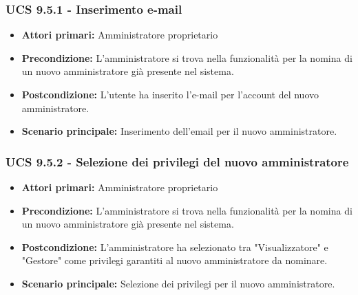 \subsubsection{UCS 9.5.1 - Inserimento e-mail}
\begin{itemize}
\item \textbf{Attori primari:} Amministratore proprietario
\item \textbf{Precondizione:} L'amministratore si trova nella funzionalità per la nomina di un nuovo amministratore già presente nel sistema.
\item \textbf{Postcondizione:} L'utente ha inserito l'e-mail per l'account del nuovo amministratore.
\item \textbf{Scenario principale:} Inserimento dell'email per il nuovo amministratore.
\end{itemize}


\subsubsection{UCS 9.5.2 - Selezione dei privilegi del nuovo amministratore}
\begin{itemize}
\item \textbf{Attori primari:} Amministratore proprietario
\item \textbf{Precondizione:} L'amministratore si trova nella funzionalità per la nomina di un nuovo amministratore già presente nel sistema.
\item \textbf{Postcondizione:} L'amministratore ha selezionato tra "Visualizzatore" e "Gestore" come privilegi garantiti al nuovo amministratore da nominare.
\item \textbf{Scenario principale:} Selezione dei privilegi per il nuovo amministratore.
\end{itemize}

